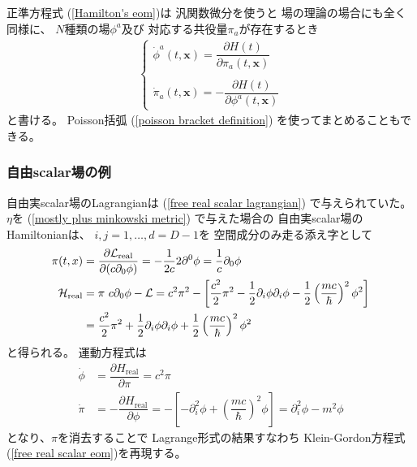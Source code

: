 正準方程式
(\ref{Hamilton's eom})は
汎関数微分を使うと
場の理論の場合にも全く同様に、
$N$種類の場$\phi^a$及び
対応する共役量$\pi_a$が存在するとき
\begin{align}
    \begin{cases}
        \dot{\phi}^a (t, \bm{x}) =
        \dfrac{\partial H (t)}
            {\partial \pi_a (t, \bm{x})}
      \\
      \\
        \dot{\pi}_a (t, \bm{x}) =
        - \dfrac{\partial H (t)}
            {\partial \phi^a(t, \bm{x})}
      \end{cases}
    \label{hamilton eom for fields}    
\end{align}
と書ける。
Poisson括弧
(\ref{poisson bracket definition})
を使ってまとめることもできる。

\subsubsection{自由scalar場の例}

自由実scalar場のLagrangianは
(\ref{free real scalar lagrangian})
で与えられていた。
$\eta$を
(\ref{mostly plus minkowski metric})
で与えた場合の
自由実scalar場のHamiltonianは、
$i, j = 1, \dots, d = D-1$を
空間成分のみ走る添え字として
\begin{subequations}
\begin{align}
    \pi(t, \bm{x})
&=
    \dfrac{ \partial \mathcal{L}_{\text{real}} }
        { \partial( c \partial_0 \phi) }
=
    - \dfrac{1}{2 c}
        2 \partial^0 \phi
=   \dfrac{1}{c}
    \partial_0 \phi
\\
    \mathcal{H}_{\text{real}}
&=
    \pi\ 
        c
        \partial_0 \phi
    -
    \mathcal{L}
=
    c^2 \pi^2
    -
    \left[
        \dfrac{ c^2 }{2}
            \pi^2
        -
        \dfrac{ 1 }{2}
            \partial_i \phi
            \partial_i \phi
        -
        \dfrac{1}{2}
        \left(
            \dfrac{m c}{\hbar}
        \right)^2
        \phi^2
    \right]
\notag\\&
=
    \dfrac{ c^2 }{2} \pi^2
    +
        \dfrac{ 1 }{2}
            \partial_i \phi
            \partial_i \phi
    +
        \dfrac{1}{2}
        \left(
            \dfrac{m c}{\hbar}
        \right)^2
        \phi^2
\end{align}
\end{subequations}
と得られる。
運動方程式は
\begin{subequations}
\begin{align}
    \dot{\phi}
&=
    \dfrac{
        \partial H_{\text{real}}
    }{ \partial \pi}
=
    c^2 \pi
\\
    \dot{\pi}
&=
    -
    \dfrac{
        \partial H_{\text{real}}
    }{ \partial \phi}
=
    - \left[
    -
        \partial_i^2 \phi
    +
        \left(
            \dfrac{m c}{\hbar}
        \right)^2
        \phi
    \right]
=
    \partial_i^2 \phi
    - m^2 \phi
\end{align}
\end{subequations}
となり、$\pi$を消去することで
Lagrange形式の結果すなわち
Klein-Gordon方程式
(\ref{free real scalar eom})を再現する。

